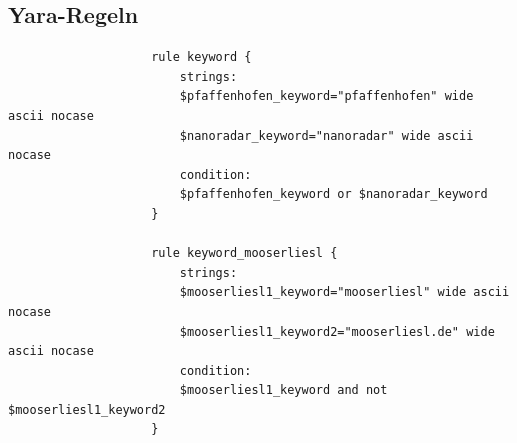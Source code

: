 
\begin{appendices}
		
		
		
		\renewcommand{\thesection}{\Alph{section}}
		
		\begin{landscape}%
			\section{Yara-Regeln}
			\label{appendix:yara-regeln}
			\setcounter{page}{43}
			\vspace*{-0.5cm}
			\begin{multicols}{2}
				\begin{verbatim}
					rule keyword {
						strings:
						$pfaffenhofen_keyword="pfaffenhofen" wide ascii nocase
						$nanoradar_keyword="nanoradar" wide ascii nocase	
						condition:
						$pfaffenhofen_keyword or $nanoradar_keyword 
					}
					
					rule keyword_mooserliesl {
						strings:
						$mooserliesl1_keyword="mooserliesl" wide ascii nocase
						$mooserliesl1_keyword2="mooserliesl.de" wide ascii nocase	
						condition:
						$mooserliesl1_keyword and not $mooserliesl1_keyword2
					}
					

\end{verbatim}
\end{multicols}
\end{landscape}
\end{appendices}
